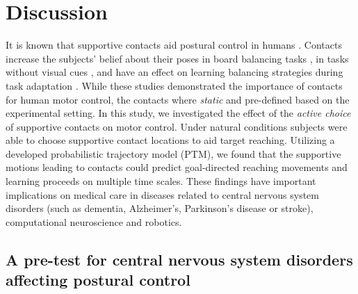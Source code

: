 

\section{Discussion}

It is known that supportive contacts aid postural control in humans 
\cite{balasubramaniam2002dynamics}. Contacts increase the subjects' belief about 
their poses in board balancing tasks \cite{slijper2000effects}, in tasks without 
visual cues \cite{johannsen2007effects}, and have an effect on learning 
balancing strategies during task adaptation \cite{babivc2014effects}. While 
these studies demonstrated the importance of contacts for human motor control, 
the contacts where \textit{static} and pre-defined based on the experimental 
setting. In this study, we investigated the effect of the \textit{active choice} 
of supportive contacts on motor control. Under natural conditions subjects were 
able to choose supportive contact locations to aid target reaching. Utilizing a 
developed probabilistic trajectory model (PTM), we found that the supportive motions 
leading to contacts could predict goal-directed reaching movements and 
learning proceeds on multiple time scales. These findings have important 
implications on medical care in diseases related to central nervous system 
disorders (such as dementia, Alzheimer's, Parkinson's disease or stroke), 
computational neuroscience and robotics. 

\subsection{A pre-test for central nervous system disorders affecting postural control} 

